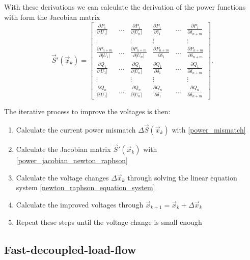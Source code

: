 With these derivations we can calculate the derivation of the power functions with form the Jacobian matrix
\begin{equation}
	\vec S' (\vec x_k) = 
	\begin{bmatrix}
		\frac{\partial P_1}{\partial |U_1|}	& \hdots	& \frac{\partial P_1}{\partial |U_n|}	& \frac{\partial P_1}{\partial \delta_1}	& \hdots	& \frac{\partial P_1}{\partial \delta_{n + m}} \\
		\vdots								&			& \vdots								& \vdots									&			& \vdots \\
		\frac{\partial P_{n + m}}{\partial |U_1|}	& \hdots	& \frac{\partial P_{n + m}}{\partial |U_n|}	& \frac{\partial P_{n + m}}{\partial \delta_1}	& \hdots	& \frac{\partial P_{n + m}}{\partial \delta_{n + m}} \\
		\frac{\partial Q_1}{\partial |U_1|}	& \hdots	& \frac{\partial Q_1}{\partial |U_n|}	& \frac{\partial Q_1}{\partial \delta_1}	& \hdots	& \frac{\partial Q_1}{\partial \delta_{n + m}} \\
		\vdots								&			& \vdots								& \vdots									&			& \vdots \\
		\frac{\partial Q_n}{\partial |U_1|}	& \hdots	& \frac{\partial Q_n}{\partial |U_n|}	& \frac{\partial Q_n}{\partial \delta_1}	& \hdots	& \frac{\partial Q_n}{\partial \delta_{n + m}}
	\end{bmatrix}.
	\label{eq:power_jacobian_newton_raphson}
\end{equation}

The iterative process to improve the voltages is then:
\begin{enumerate}
	\item Calculate the current power mismatch $\Delta \vec S (\vec x_k)$ with \eqref{power_mismatch}
	\item Calculate the Jacobian matrix $\vec S' (\vec x_k)$ with \eqref{power_jacobian_newton_raphson}
	\item Calculate the voltage changes $\Delta \vec x_k$ through solving the linear equation system \eqref{newton_raphson_equation_system}
	\item Calculate the improved voltages through $\vec x_{k + 1} = \vec x_k + \Delta \vec x_k$
	\item Repeat these steps until the voltage change is small enough
\end{enumerate}

\subsection{Fast-decoupled-load-flow}
\label{sec:fdlf}

